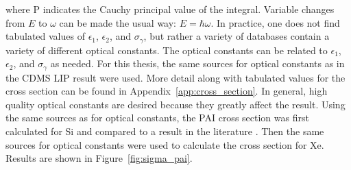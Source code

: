 where P indicates the Cauchy principal value of the integral. Variable changes from $E$ to $\omega$ can be made the usual way: $E = \hbar \omega$. In practice, one does not find tabulated values of $\epsilon_{1}$, $\epsilon_{2}$, and $\sigma_{\gamma}$, but rather a variety of databases contain a variety of different optical constants. The optical constants can be related to $\epsilon_{1}$, $\epsilon_{2}$, and $\sigma_{\gamma}$ as needed. For this thesis, the same sources for optical constants as in the \ac{CDMS} \ac{LIP} result \cite{Prasad2013} were used. More detail along with tabulated values for the cross section can be found in Appendix~\ref{app:cross_section}. In general, high quality optical constants are desired because they greatly affect the result. Using the same sources as \cite{Prasad2013} for optical constants, the \ac{PAI} cross section was first calculated for Si and compared to a result in the literature \cite{Bichsel:2006}. Then the same sources for optical constants were used to calculate the cross section for Xe. Results are shown in Figure~\ref{fig:sigma_pai}. 



